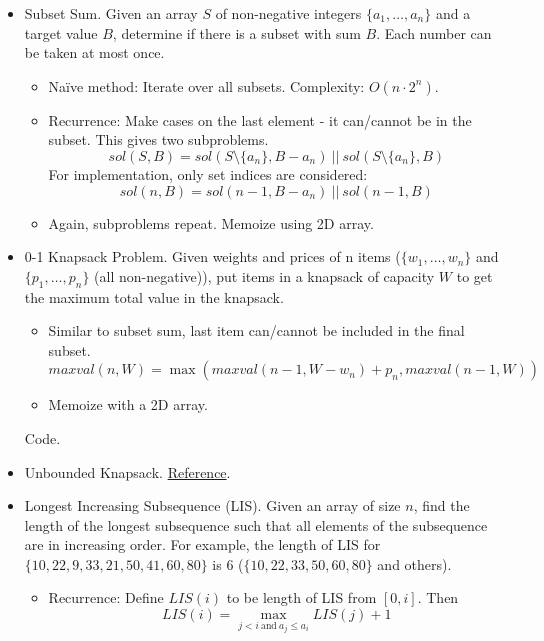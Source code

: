 \documentclass{article}
\begin{document}
\begin{sloppypar}
\begin{itemize}
        \item Subset Sum. Given an array $S$ of non-negative integers $\{a_1, \dots, a_n\}$ and a target value $B$, determine if there
        is a subset with sum $B$. Each number can be taken at most once.
        \begin{itemize}
            \item Na\"ive method: Iterate over all subsets. Complexity: $O(n\cdot 2^n)$.
            \item Recurrence: Make cases on the last element - it can/cannot be in the subset. This gives two subproblems.
            $$sol(S, B) = sol(S\setminus\{a_n\}, B-a_n)\ ||\ sol(S\setminus\{a_n\}, B)$$
            For implementation, only set indices are considered:
            $$sol(n,B) = sol(n-1,B-a_n)\ ||\ sol(n-1,B)$$
            \item Again, subproblems repeat. Memoize using 2D array.
        \end{itemize}

        \item 0-1 Knapsack Problem. Given weights and prices of n items ($\{w_1,\dots,w_n\}$ and $\{p_1,\dots,p_n\}$ (all non-negative)), put items in a knapsack of capacity $W$ to get the maximum total value in the knapsack.
        \begin{itemize}
            \item Similar to subset sum, last item can/cannot be included in the final subset.
            $$maxval(n,W) = \max(maxval(n-1,W-w_n)+p_n, maxval(n-1,W))$$
            \item Memoize with a 2D array.
        \end{itemize}
        Code.

        \item Unbounded Knapsack. \href{https://www.geeksforgeeks.org/unbounded-knapsack-repetition-items-allowed/}{Reference}.
        
        \item Longest Increasing Subsequence (LIS). Given an array of size $n$, find the length of the longest subsequence such that all elements of the subsequence are in increasing order. For example, the length of LIS for $\{10, 22, 9, 33, 21, 50, 41, 60, 80\}$ is 6 ($\{10, 22, 33, 50, 60, 80\}$ and others).
        \begin{itemize}
            \item Recurrence: Define $LIS(i)$ to be length of LIS from $[0,i]$. Then
            $$LIS(i) = \max_{j<i\ \text{and}\ a_j\le a_i}{LIS(j)+1}$$
        \end{itemize}


\end{itemize}
\end{sloppypar}
\end{document}
